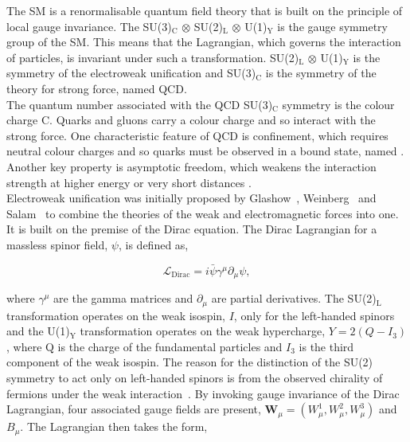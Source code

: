 The \ac{SM} is a renormalisable quantum field theory that is built on the principle of local gauge invariance.
The SU(3)$_{\text{C}}$ $\otimes$ SU(2)$_{\text{L}}$ $\otimes$ U(1)$_{\text{Y}}$ is the gauge symmetry group of the \ac{SM}.
This means that the Lagrangian, which governs the interaction of particles, is invariant under such a transformation. 
SU(2)$_{\text{L}}$ $\otimes$ U(1)$_{\text{Y}}$ is the symmetry of the electroweak unification and SU(3)$_{\text{C}}$ is the symmetry of the theory for strong force, named \ac{QCD}. \\

The quantum number associated with the \ac{QCD} SU(3)$_\text{C}$ symmetry is the colour charge C.
Quarks and gluons carry a colour charge and so interact with the strong force.
One characteristic feature of \ac{QCD} is confinement, which requires neutral colour charges and so quarks must be observed in a bound state, named .
Another key property is asymptotic freedom, which weakens the interaction strength at higher energy or very short distances \cite{Gross:1973id,Politzer:1973fx}. \\

Electroweak unification was initially proposed by Glashow~\cite{Glashow:1961tr}, Weinberg~\cite{Weinberg:1967tq} and Salam~\cite{Salam:1968rm} to combine the theories of the weak and electromagnetic forces into one.
It is built on the premise of the Dirac equation.
The Dirac Lagrangian for a massless spinor field, $\psi$, is defined as,

\begin{equation}
\mathcal{L}_{\text{Dirac}} = i\bar{\psi}\gamma^{\mu} \partial_{\mu} \psi,
\end{equation}

where $\gamma^{\mu}$ are the gamma matrices and $\partial_{\mu}$ are partial derivatives.
The SU(2)$_{\text{L}}$ transformation operates on the weak isospin, $I$, only for the left-handed spinors and the U(1)$_{\text{Y}}$ transformation operates on the weak hypercharge, $Y=2(Q-I_{3})$, where Q is the charge of the fundamental particles and $I_3$ is the third component of the weak isospin.
The reason for the distinction of the SU(2) symmetry to act only on left-handed spinors is from the observed chirality of fermions under the weak interaction~\cite{Lee:1956qn}.
By invoking gauge invariance of the Dirac Lagrangian, four associated gauge fields are present, $\boldsymbol{W}_{\mu} = (W^{1}_{\mu}, W^{2}_{\mu}, W^{3}_{\mu})$ and $B_{\mu}$.
The Lagrangian then takes the form,

